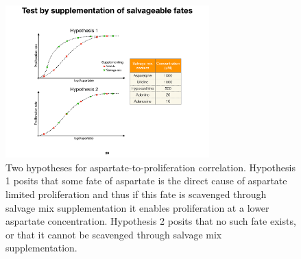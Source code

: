 \begin{figure}
    \centering
    \includegraphics[width=0.70\textwidth]{figures/chap1/asp_fates_suppl_hypo.pdf}
    \caption[Two hypotheses for aspartate-to-proliferation correlation.]{
    Two hypotheses for aspartate-to-proliferation correlation.
    Hypothesis 1 posits that some fate of aspartate is the direct cause of aspartate limited proliferation and thus if this fate is scavenged through salvage mix supplementation it enables proliferation at a lower aspartate concentration.
    Hypothesis 2 posits that no such fate exists, or that it cannot be scavenged through salvage mix supplementation.
    }
    \label{fig:ch1:asp_fates_suppl_hypo}
\end{figure}







